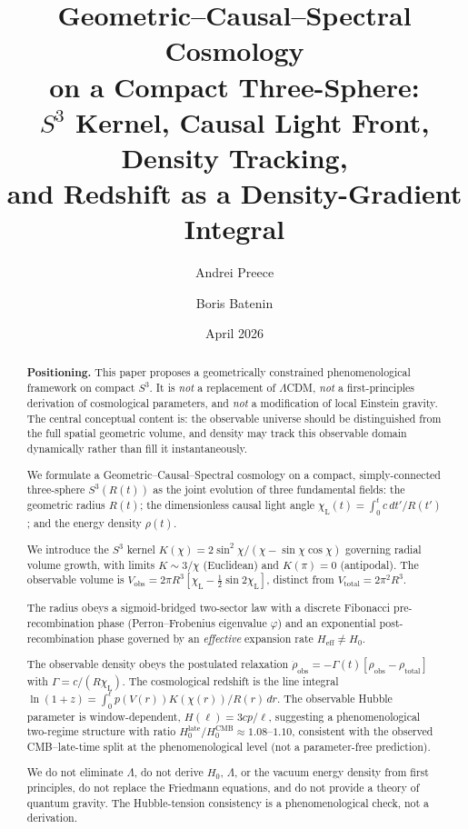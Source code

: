 \documentclass[12pt,a4paper]{amsart}
\title[Geometric--Causal--Spectral Cosmology on Compact $S^3$]{
  Geometric--Causal--Spectral Cosmology\\
  on a Compact Three-Sphere:\\
  $S^3$ Kernel, Causal Light Front, Density Tracking,\\
  and Redshift as a Density-Gradient Integral}
\author{Andrei Preece}
\author{Boris Batenin}
\date{April 2026}
\theoremstyle{plain}
\theoremstyle{definition}
\theoremstyle{remark}
\newcommand{\vp}{\varphi}
\newcommand{\Sthree}{S^3}
\newcommand{\Hzero}{H_0}
\newcommand{\Heff}{H_{\mathrm{eff}}}
\newcommand{\Lam}{\ensuremath{\Lambda}}
\newcommand{\half}{\tfrac{1}{2}}
\newcommand{\Vtot}{V_{\mathrm{total}}}
\newcommand{\Vobs}{V_{\mathrm{obs}}}
\newcommand{\chiL}{\chi_{\mathrm{L}}}
\newcommand{\rhotot}{\rho_{\mathrm{total}}}
\newcommand{\rhoobs}{\rho_{\mathrm{obs}}}
\begin{document}
\begin{abstract}
\textbf{Positioning.} This paper proposes a geometrically constrained
phenomenological framework on compact $\Sthree$. It is \emph{not} a
replacement of $\Lambda$CDM, \emph{not} a first-principles derivation
of cosmological parameters, and \emph{not} a modification of local
Einstein gravity. The central conceptual content is: the observable
universe should be distinguished from the full spatial geometric
volume, and density may track this observable domain dynamically rather
than fill it instantaneously.

We formulate a Geometric--Causal--Spectral cosmology on a compact,
simply-connected three-sphere $\Sthree(R(t))$ as the joint evolution
of three fundamental fields: the geometric radius $R(t)$; the
dimensionless causal light angle
$\chiL(t)=\int_0^t c\,dt'/R(t')$; and the energy density $\rho(t)$.

We introduce the $\Sthree$ kernel
$K(\chi)=2\sin^2\!\chi/(\chi-\sin\chi\cos\chi)$ governing radial volume
growth, with limits $K\sim 3/\chi$ (Euclidean) and $K(\pi)=0$
(antipodal). The observable volume is
$\Vobs=2\pi R^3[\chiL-\half\sin 2\chiL]$, distinct from
$\Vtot=2\pi^2 R^3$.

The radius obeys a sigmoid-bridged two-sector law with a discrete
Fibonacci pre-recombination phase (Perron--Frobenius eigenvalue $\vp$)
and an exponential post-recombination phase governed by an
\emph{effective} expansion rate $\Heff\neq\Hzero$.

The observable density obeys the postulated relaxation
$\dot\rhoobs=-\Gamma(t)[\rhoobs-\rhotot]$ with $\Gamma=c/(R\chiL)$.
The cosmological redshift is the line integral
$\ln(1+z)=\int_0^\ell p(V(r))K(\chi(r))/R(r)\,dr$.
The observable Hubble parameter is window-dependent,
$H(\ell)=3cp/\ell$, suggesting a phenomenological two-regime structure with ratio
$\Hzero^{\mathrm{late}}/\Hzero^{\mathrm{CMB}}\approx 1.08$--$1.10$,
consistent with the observed CMB--late-time split at the
phenomenological level (not a parameter-free prediction).

We do not eliminate $\Lam$, do not derive $\Hzero$, $\Lam$, or the
vacuum energy density from first principles, do not replace the
Friedmann equations, and do not provide a theory of quantum
gravity. The Hubble-tension consistency is a phenomenological
check, not a derivation.
\end{abstract}

\maketitle
\tableofcontents
\end{document}
